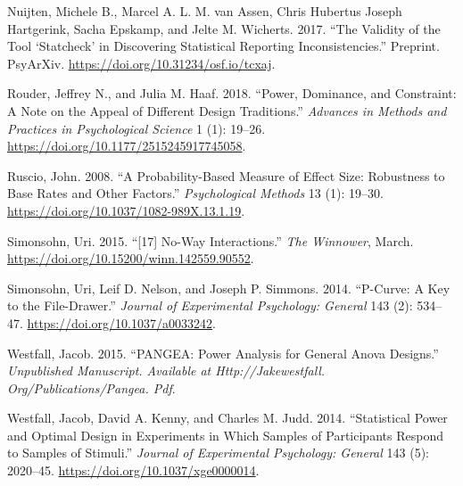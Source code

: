 \documentclass[]{article}
\begin{document}
\leavevmode\hypertarget{ref-Nuijten2017}{}%
Nuijten, Michele B., Marcel A. L. M. van Assen, Chris Hubertus Joseph
Hartgerink, Sacha Epskamp, and Jelte M. Wicherts. 2017. ``The Validity
of the Tool `Statcheck' in Discovering Statistical Reporting
Inconsistencies.'' Preprint. PsyArXiv.
\url{https://doi.org/10.31234/osf.io/tcxaj}.

\leavevmode\hypertarget{ref-Rouder2018}{}%
Rouder, Jeffrey N., and Julia M. Haaf. 2018. ``Power, Dominance, and
Constraint: A Note on the Appeal of Different Design Traditions.''
\emph{Advances in Methods and Practices in Psychological Science} 1 (1):
19--26. \url{https://doi.org/10.1177/2515245917745058}.

\leavevmode\hypertarget{ref-Ruscio2008}{}%
Ruscio, John. 2008. ``A Probability-Based Measure of Effect Size:
Robustness to Base Rates and Other Factors.'' \emph{Psychological
Methods} 13 (1): 19--30.
\url{https://doi.org/10.1037/1082-989X.13.1.19}.

\leavevmode\hypertarget{ref-Simonsohn2015}{}%
Simonsohn, Uri. 2015. ``{[}17{]} No-Way Interactions.'' \emph{The
Winnower}, March. \url{https://doi.org/10.15200/winn.142559.90552}.

\leavevmode\hypertarget{ref-Simonsohn2014}{}%
Simonsohn, Uri, Leif D. Nelson, and Joseph P. Simmons. 2014. ``P-Curve:
A Key to the File-Drawer.'' \emph{Journal of Experimental Psychology:
General} 143 (2): 534--47. \url{https://doi.org/10.1037/a0033242}.

\leavevmode\hypertarget{ref-westfall2015pangea}{}%
Westfall, Jacob. 2015. ``PANGEA: Power Analysis for General Anova
Designs.'' \emph{Unpublished Manuscript. Available at
Http://Jakewestfall. Org/Publications/Pangea. Pdf}.

\leavevmode\hypertarget{ref-Westfall2014}{}%
Westfall, Jacob, David A. Kenny, and Charles M. Judd. 2014.
``Statistical Power and Optimal Design in Experiments in Which Samples
of Participants Respond to Samples of Stimuli.'' \emph{Journal of
Experimental Psychology: General} 143 (5): 2020--45.
\url{https://doi.org/10.1037/xge0000014}.
\end{document}
